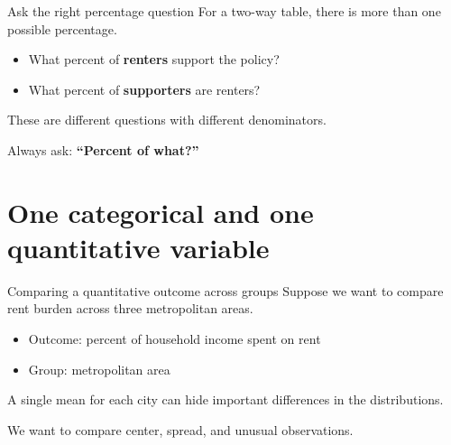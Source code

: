 \documentclass[11pt,aspectratio=169]{beamer}
\begin{document}
\begin{frame}{Ask the right percentage question}
For a two-way table, there is more than one possible percentage.

\vspace{0.6em}
\begin{itemize}
  \item What percent of \textbf{renters} support the policy?
  \item What percent of \textbf{supporters} are renters?
\end{itemize}

These are \alert{different questions} with different denominators.

\vspace{0.8em}
\begin{center}
\Large Always ask: \textbf{``Percent of what?''}
\end{center}
\end{frame}

\section{One categorical and one quantitative variable}

\begin{frame}{Comparing a quantitative outcome across groups}
Suppose we want to compare rent burden across three metropolitan areas.

\vspace{0.5em}
\begin{itemize}
  \item Outcome: percent of household income spent on rent
  \item Group: metropolitan area
\end{itemize}

A single mean for each city can hide important differences in the distributions.

\vspace{0.6em}
\begin{center}
\alert{We want to compare center, spread, and unusual observations.}
\end{center}
\end{frame}
\end{document}
